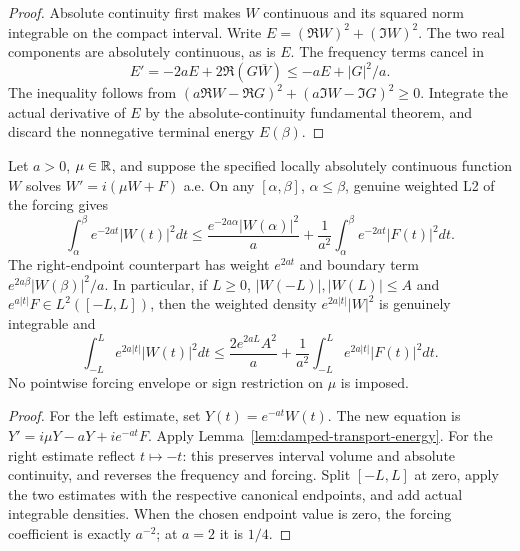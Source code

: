 \begin{proof}
\leanok
Absolute continuity first makes $W$ continuous and its squared norm integrable
on the compact interval. Write $E=(\Re W)^2+(\Im W)^2$.
The two real components are absolutely continuous, as is $E$.
The frequency terms cancel in
\[
 E'=-2aE+2\Re(G\overline W)
 \le -aE+|G|^2/a .
\]
The inequality follows from
$(a\Re W-\Re G)^2+(a\Im W-\Im G)^2\ge0$.
Integrate the actual derivative of $E$ by the absolute-continuity fundamental
theorem, and discard the nonnegative terminal energy $E(\beta)$.
\end{proof}

\begin{lemma}
\label{lem:transport-weighted-endpoint-energy}
\leanok
Let $a>0$, $\mu\in\mathbb{R}$, and suppose the specified locally absolutely continuous
function $W$ solves $W'=i(\mu W+F)$ a.e.
On any $[\alpha,\beta]$, $\alpha\le\beta$, genuine weighted L2 of the forcing gives
\[
 \int_\alpha^\beta e^{-2at}|W(t)|^2dt
 \le \frac{e^{-2a\alpha}|W(\alpha)|^2}{a}
       +\frac1{a^2}\int_\alpha^\beta e^{-2at}|F(t)|^2dt .
\]
The right-endpoint counterpart has weight $e^{2at}$ and boundary term
$e^{2a\beta}|W(\beta)|^2/a$.
In particular, if $L\ge0$, $|W(-L)|,|W(L)|\le A$ and
$e^{a|t|}F\in L^2([-L,L])$, then the weighted density
$e^{2a|t|}|W|^2$ is genuinely integrable and
\[
 \int_{-L}^L e^{2a|t|}|W(t)|^2dt
 \le \frac{2e^{2aL}A^2}{a}
       +\frac1{a^2}\int_{-L}^L e^{2a|t|}|F(t)|^2dt .
\]
No pointwise forcing envelope or sign restriction on $\mu$ is imposed.
\end{lemma}

\begin{proof}
\leanok
For the left estimate, set $Y(t)=e^{-at}W(t)$.
The new equation is $Y'=i\mu Y-aY+ie^{-at}F$.
Apply Lemma~\ref{lem:damped-transport-energy}.
For the right estimate reflect $t\mapsto-t$: this preserves interval volume
and absolute continuity, and reverses the frequency and forcing.
Split $[-L,L]$ at zero, apply the two estimates with the respective
canonical endpoints, and add actual integrable densities.
When the chosen endpoint value is zero, the forcing coefficient is
exactly $a^{-2}$; at $a=2$ it is $1/4$.
\end{proof}

